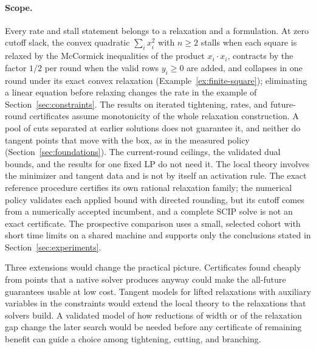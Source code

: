 \paragraph{Scope.} Every rate and stall statement belongs to a relaxation and
a formulation. At zero cutoff slack, the convex quadratic $\sum_ix_i^2$ with
$n\ge2$ stalls when each square is relaxed by the McCormick inequalities of
the product $x_i\cdot x_i$, contracts by the factor $1/2$ per round when the
valid rows $y_i\ge0$ are added, and collapses in one round under its exact
convex relaxation (Example~\ref{ex:finite-square}); eliminating a linear
equation before relaxing changes the rate in the example of
Section~\ref{sec:constraints}. The results on iterated tightening, rates,
and future-round certificates assume monotonicity of the whole relaxation
construction. A pool of cuts separated at earlier solutions does not
guarantee it, and neither do tangent points that move with the box, as in
the measured policy (Section~\ref{sec:foundations}). The current-round
ceilings, the validated dual bounds, and the results for one fixed LP do
not need it. The local theory involves the minimizer and tangent data
and is not by itself an activation rule. The exact reference procedure
certifies its own rational relaxation family; the numerical policy validates
each applied bound with directed rounding, but its cutoff comes from a
numerically accepted incumbent, and a complete SCIP solve is not an exact
certificate. The prospective comparison uses a small, selected cohort with
short time limits on a shared machine and supports only the conclusions
stated in Section~\ref{sec:experiments}.

Three extensions would change the practical picture. Certificates found
cheaply from points that a native solver produces anyway could make the
all-future guarantees usable at low cost. Tangent models for lifted
relaxations with auxiliary variables in the constraints would extend the
local theory to the relaxations that solvers build. A validated model of how
reductions of width or of the relaxation gap change the later search would be
needed before any certificate of remaining benefit can guide a choice among
tightening, cutting, and branching.
